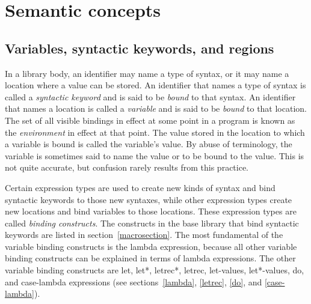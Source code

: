 \chapter{Semantic concepts}
\label{basicchapter}

\section{Variables, syntactic keywords, and regions}
\label{specialformsection}
\label{variablesection}

In a library body,
an identifier may name a type of syntax, or it may name
a location where a value can be stored.  An identifier that names a type
of syntax is called a {\em syntactic keyword}
and is said to be {\em bound} to that syntax.  An identifier that names a
location is called a {\em variable} and is said to be
{\em bound} to that location.  The set of all visible
bindings in effect at some point in a program is
known as the {\em environment} in effect at that point.  The value
stored in the location to which a variable is bound is called the
variable's value.  By abuse of terminology, the variable is sometimes
said to name the value or to be bound to the value.  This is not quite
accurate, but confusion rarely results from this practice.



\vest Certain expression types are used to create new kinds of syntax
and bind syntactic keywords to those new syntaxes, while other
expression types create new locations and bind variables to those
locations.  These expression types are called {\em binding constructs}.
The constructs in the base library that bind syntactic keywords are listed in section~\ref{macrosection}.
The most fundamental of the variable binding constructs is the
{\cf lambda} expression, because all other variable binding constructs
can be explained in terms of {\cf lambda} expressions.  The other
variable binding constructs are {\cf let}, {\cf let*}, {\cf letrec*},
{\cf letrec}, {\cf let-values}, {\cf let*-values}, {\cf do}, and {\cf
  case-lambda} expressions (see sections~\ref{lambda}, \ref{letrec}, 
\ref{do}, and \ref{case-lambda}).

